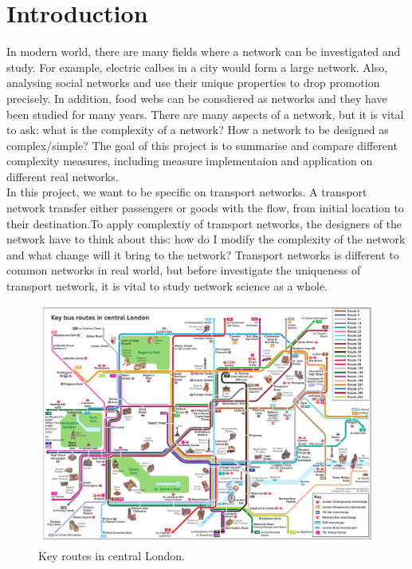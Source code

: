 \documentclass[12pt]{article}
\begin{document}
\section{Introduction}
In modern world, there are many fields where a network can be investigated and study. For example, electric calbes in a city would form a large network.\cite{5275353} Also, analysing social networks and use their unique properties to drop promotion precisely.\cite{stefko2011virtual} In addition, food webs can be consdiered as networks and they have been
studied for many years.\cite{dunne2002food} There are many aspects of a network, but it is vital to ask: what is the complexity of a network? How a network to be designed as complex/simple? The goal of this project is to summarise and compare different complexity measures, including measure implementaion and application on different real networks.
\\
In this project, we want to be specific on transport networks. A transport network transfer either passengers or goods with the flow, from initial location to their destination.To apply complextiy of transport networks, the designers of the network have to think about this: how do I modify the complexity of the network and what change will it bring to the network? Transport networks is different to common networks in real world, but before investigate the uniqueness of transport network, it is vital to study network science as a whole.\\
\begin{figure}[!h]
    \centering
    \includegraphics[width=\textwidth]{key-bus-routes-in-central-london.pdf}
    \caption{Key routes in central London.\cite{london_bus}}
\end{figure}
\end{document}
